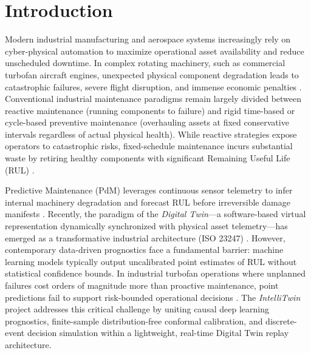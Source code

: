 \documentclass[12pt,a4paper]{article}
\begin{document}
\newpage
\setcounter{page}{1}

\section{Introduction}
Modern industrial manufacturing and aerospace systems increasingly rely on cyber-physical automation to maximize operational asset availability and reduce unscheduled downtime. In complex rotating machinery, such as commercial turbofan aircraft engines, unexpected physical component degradation leads to catastrophic failures, severe flight disruption, and immense economic penalties \cite{saxena2008damage, robinson2026turbofan}. Conventional industrial maintenance paradigms remain largely divided between reactive maintenance (running components to failure) and rigid time-based or cycle-based preventive maintenance (overhauling assets at fixed conservative intervals regardless of actual physical health). While reactive strategies expose operators to catastrophic risks, fixed-schedule maintenance incurs substantial waste by retiring healthy components with significant Remaining Useful Life (RUL) \cite{lee2023industrial}.

Predictive Maintenance (PdM) leverages continuous sensor telemetry to infer internal machinery degradation and forecast RUL before irreversible damage manifests \cite{diao2026ensemble}. Recently, the paradigm of the \textit{Digital Twin}---a software-based virtual representation dynamically synchronized with physical asset telemetry---has emerged as a transformative industrial architecture (ISO 23247) \cite{chen2022digital, iso23247_1}. However, contemporary data-driven prognostics face a fundamental barrier: machine learning models typically output uncalibrated point estimates of RUL without statistical confidence bounds. In industrial turbofan operations where unplanned failures cost orders of magnitude more than proactive maintenance, point predictions fail to support risk-bounded operational decisions \cite{cortesgomez2025predictive}. The \textit{IntelliTwin} project addresses this critical challenge by uniting causal deep learning prognostics, finite-sample distribution-free conformal calibration, and discrete-event decision simulation within a lightweight, real-time Digital Twin replay architecture.

\end{document}
